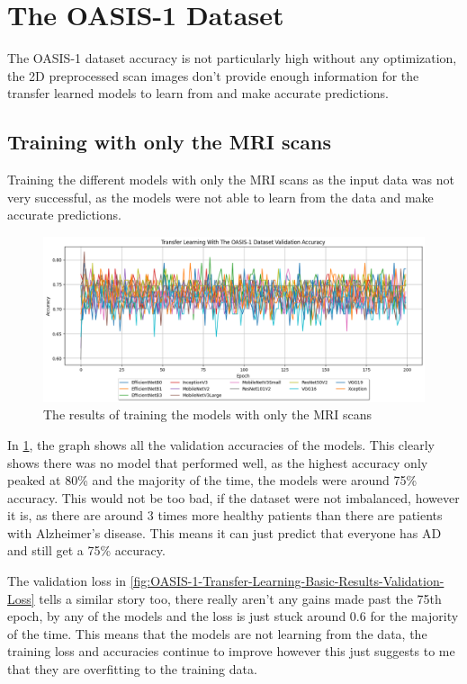\documentclass[]{final_report}
\begin{document}
\section{The OASIS-1 Dataset}

The OASIS-1 dataset accuracy is not particularly high without any optimization, the 2D preprocessed scan images don't provide enough information for the transfer learned models to learn from and make accurate predictions.

\subsection{Training with only the MRI scans}

Training the different models with only the MRI scans as the input data was not very successful, as the models were not able to learn from the data and make accurate predictions. 

\begin{figure}[ht!]
  \centering
  \includegraphics[width=1\textwidth]{images/OASIS-1-Transfer-Learning-Basic-Results.png}
  \caption{The results of training the models with only the MRI scans}
  \label{fig:OASIS-1-Transfer-Learning-Basic-Results-Accuracy}
\end{figure}

In \ref{fig:OASIS-1-Transfer-Learning-Basic-Results-Accuracy}, the graph shows all the validation accuracies of the models. This clearly shows there was no model that performed well, as the highest accuracy only peaked at 80\% and the majority of the time, the models were around 75\% accuracy. This would not be too bad, if the dataset were not imbalanced, however it is, as there are around 3 times more healthy patients than there are patients with Alzheimer's disease. This means it can just predict that everyone has AD and still get a 75\% accuracy. 

The validation loss in \ref{fig:OASIS-1-Transfer-Learning-Basic-Results-Validation-Loss} tells a similar story too, there really aren't any gains made past the 75th epoch, by any of the models and the loss is just stuck around 0.6 for the majority of the time. This means that the models are not learning from the data, the training loss and accuracies continue to improve however this just suggests to me that they are overfitting to the training data.
 
\end{document}
